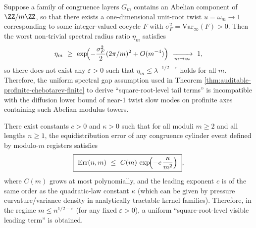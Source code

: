 \begin{corollary}\label{cor:abelian-tower-no-go}
Suppose a family of congruence layers \(G_m\) contains an Abelian component of \(\ZZ/m\ZZ\), so that there exists a one-dimensional unit-root twist \(u=\omega_m\to 1\)
corresponding to some integer-valued cocycle \(F\) with \(\sigma_F^2=\mathrm{Var}_\infty(F)>0\).
Then the worst non-trivial spectral radius ratio \(\eta_m\) satisfies
\[
\eta_m\ \ge\ \exp\!\Bigl(-\frac{\sigma_F^2}{2}(2\pi/m)^2+O(m^{-4})\Bigr)\ \xrightarrow[m\to\infty]{}\ 1,
\]
so there does not exist any \(\varepsilon>0\) such that \(\eta_m\le \lambda^{-1/2-\varepsilon}\) holds for all \(m\).
Therefore, the uniform spectral gap assumption used in Theorem \ref{thm:auditable-profinite-chebotarev-finite} to derive ``square-root-level tail terms''
is incompatible with the diffusion lower bound of near-\(1\) twist slow modes on profinite axes containing such Abelian modulus towers.
\end{corollary}



\begin{conjecture}\label{conj:scaled-kernel-grh-diffusive}
There exist constants \(c>0\) and \(\kappa>0\) such that for all moduli \(m\ge 2\) and all lengths \(n\ge 1\), the equidistribution error of any congruence cylinder event defined by modulo-\(m\) registers satisfies
\[
\boxed{\ \mathrm{Err}(n,m)\ \le\ C(m)\,\exp\!\Bigl(-c\,\frac{n}{m^2}\Bigr)\ },
\]
where \(C(m)\) grows at most polynomially, and the leading exponent \(c\) is of the same order as the quadratic-law constant \(\kappa\) (which can be given by pressure curvature/variance density in analytically tractable kernel families).
Therefore, in the regime \(m\le n^{1/2-\varepsilon}\) (for any fixed \(\varepsilon>0\)), a uniform ``square-root-level visible leading term'' is obtained.
\end{conjecture}

\endinput
